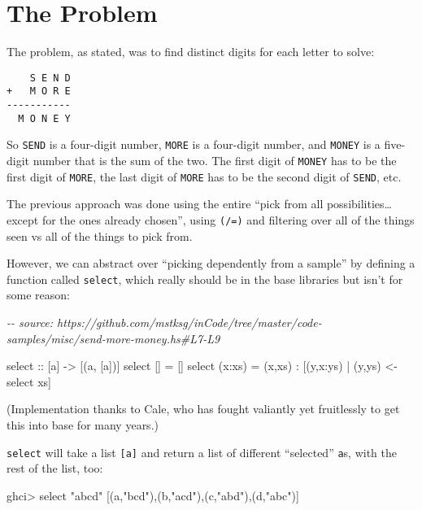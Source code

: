 \documentclass[]{article}
\newenvironment{Shaded}{}{}
\newcommand{\CharTok}[1]{\textcolor[rgb]{0.25,0.44,0.63}{#1}}
\newcommand{\CommentTok}[1]{\textcolor[rgb]{0.38,0.63,0.69}{\textit{#1}}}
\newcommand{\NormalTok}[1]{#1}
\newcommand{\OperatorTok}[1]{\textcolor[rgb]{0.40,0.40,0.40}{#1}}
\newcommand{\OtherTok}[1]{\textcolor[rgb]{0.00,0.44,0.13}{#1}}
\newcommand{\StringTok}[1]{\textcolor[rgb]{0.25,0.44,0.63}{#1}}
\begin{document}
\section{The Problem}\label{the-problem}

The problem, as stated, was to find distinct digits for each letter to solve:

\begin{verbatim}
    S E N D
+   M O R E
-----------
  M O N E Y
\end{verbatim}

So \texttt{SEND} is a four-digit number, \texttt{MORE} is a four-digit number,
and \texttt{MONEY} is a five-digit number that is the sum of the two. The first
digit of \texttt{MONEY} has to be the first digit of \texttt{MORE}, the last
digit of \texttt{MORE} has to be the second digit of \texttt{SEND}, etc.

The previous approach was done using the entire ``pick from all
possibilities\ldots except for the ones already chosen'', using \texttt{(/=)}
and filtering over all of the things seen vs all of the things to pick from.

However, we can abstract over ``picking dependently from a sample'' by defining
a function called \texttt{select}, which really should be in the base libraries
but isn't for some reason:

\begin{Shaded}
\begin{Highlighting}[]
\CommentTok{{-}{-} source: https://github.com/mstksg/inCode/tree/master/code{-}samples/misc/send{-}more{-}money.hs\#L7{-}L9}

\OtherTok{select ::}\NormalTok{ [a] }\OtherTok{{-}\textgreater{}}\NormalTok{ [(a, [a])]}
\NormalTok{select []     }\OtherTok{=}\NormalTok{ []}
\NormalTok{select (x}\OperatorTok{:}\NormalTok{xs) }\OtherTok{=}\NormalTok{ (x,xs) }\OperatorTok{:}\NormalTok{ [(y,x}\OperatorTok{:}\NormalTok{ys) }\OperatorTok{|}\NormalTok{ (y,ys) }\OtherTok{\textless{}{-}}\NormalTok{ select xs]}
\end{Highlighting}
\end{Shaded}

(Implementation thanks to Cale, who has fought valiantly yet fruitlessly to get
this into base for many years.)

\texttt{select} will take a list \texttt{{[}a{]}} and return a list of different
``selected'' \texttt{a}s, with the rest of the list, too:

\begin{Shaded}
\begin{Highlighting}[]
\NormalTok{ghci}\OperatorTok{\textgreater{}}\NormalTok{ select }\StringTok{"abcd"}
\NormalTok{[(}\CharTok{\textquotesingle{}a\textquotesingle{}}\NormalTok{,}\StringTok{"bcd"}\NormalTok{),(}\CharTok{\textquotesingle{}b\textquotesingle{}}\NormalTok{,}\StringTok{"acd"}\NormalTok{),(}\CharTok{\textquotesingle{}c\textquotesingle{}}\NormalTok{,}\StringTok{"abd"}\NormalTok{),(}\CharTok{\textquotesingle{}d\textquotesingle{}}\NormalTok{,}\StringTok{"abc"}\NormalTok{)]}
\end{Highlighting}
\end{Shaded}
\end{document}
